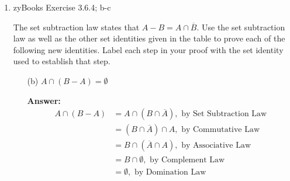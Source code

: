 \documentclass[14pt]{extreport}
\newcommand{\answer}[0]{\medskip \textbf{Answer:} \medskip}
\newcommand{\union}[0]{\cup}
\newcommand{\intersect}[0]{\cap}
\begin{document}
\begin{enumerate}
\begin{enumerate}
                \answer

                Let \( A \) be any set except the empty set, and let \( B = A \). Then \( B \intersect A = A \) by idempotency. Then \( A - A \) is the empty set. As a concrete example, \( A = \{1\}, B = \{1\} \) is a counterexample.

            \item[(d)] \( (B - A) \union A = A \)
            
                \answer

                Let \( B = \{1, 2\} \) and \( A = \{1\} \). Then:
                \begin{align*}
                    (B - A) \union A &= (\{1, 2\} - \{1\}) \union \{1\} \\
                                     &= \{2\} \union \{1\} \\
                                     &= \{2, 1\}
                \end{align*}

                Which does not equal \( A \).
                
        \end{enumerate}

    \item zyBooks Exercise 3.6.4; b-c
    
    The set subtraction law states that \( A - B = A \intersect \overline{B} \). Use the set subtraction law as well as the other set identities given in the table to prove each of the following new identities. Label each step in your proof with the set identity used to establish that step.
    
        \begin{enumerate}
            
            \item[(b)] \( A \intersect (B - A) = \emptyset \)
            
                \answer
                \begin{align*}
                    A \intersect (B - A) &= A \intersect (B \intersect \overline{A}), \text{ by Set Subtraction Law} \\
                        &= (B \intersect \overline{A}) \intersect A, \text{ by Commutative Law} \\
                        &= B \intersect (\overline{A} \intersect A), \text{ by Associative Law} \\
                        &= B \intersect \emptyset, \text{ by Complement Law} \\
                        &= \emptyset, \text{ by Domination Law}
                \end{align*}


\end{enumerate}
\end{enumerate}
\end{document}
